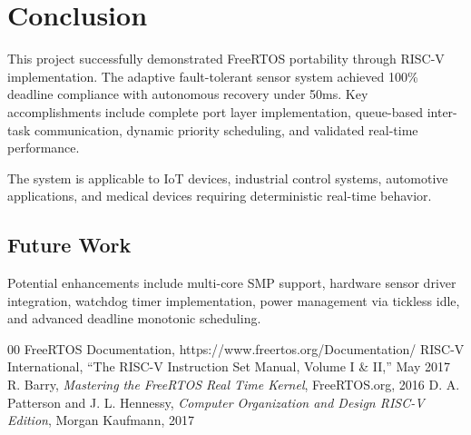 \documentclass[conference]{IEEEtran}
\begin{document}
\section{Conclusion}

This project successfully demonstrated FreeRTOS portability through RISC-V implementation. The adaptive fault-tolerant sensor system achieved 100\% deadline compliance with autonomous recovery under 50ms. Key accomplishments include complete port layer implementation, queue-based inter-task communication, dynamic priority scheduling, and validated real-time performance.

The system is applicable to IoT devices, industrial control systems, automotive applications, and medical devices requiring deterministic real-time behavior.

\subsection{Future Work}
Potential enhancements include multi-core SMP support, hardware sensor driver integration, watchdog timer implementation, power management via tickless idle, and advanced deadline monotonic scheduling.

\begin{thebibliography}{00}
 FreeRTOS Documentation, https://www.freertos.org/Documentation/
 RISC-V International, ``The RISC-V Instruction Set Manual, Volume I \& II,'' May 2017
 R. Barry, \textit{Mastering the FreeRTOS Real Time Kernel}, FreeRTOS.org, 2016
 D. A. Patterson and J. L. Hennessy, \textit{Computer Organization and Design RISC-V Edition}, Morgan Kaufmann, 2017
\end{thebibliography}
\end{document}
